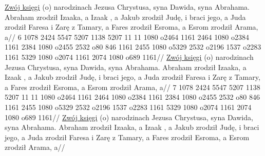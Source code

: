 \glb \underline{Zwój księgi} (o) narodzinach Jezusa Chrystusa, syna Dawida, syna Abrahama.  Abraham zrodził Izaaka, a Izaak , a Jakub zrodził Judę, i braci jego,  a Juda zrodził Faresa i Zarę z Tamary, a Fares zrodził Esroma, a Esrom zrodził Arama,  a//
\endgl
\begingl\lettrine[loversize=1,lraise=-1.3]{6 }{}%
 {} 1078 2424 5547 5207 1138 5207 11 {} 11 1080 o2464 1161 2464 1080 o2384 1161 2384 1080 o2455 2532 o80 846 {} 1161 2455 1080 o5329 2532 o2196 1537 o2283 1161 5329 1080 o2074 1161 2074 1080 o689 {} 1161//
\glb \underline{Zwój księgi} (o) narodzinach Jezusa Chrystusa, syna Dawida, syna Abrahama.  Abraham zrodził Izaaka, a Izaak , a Jakub zrodził Judę, i braci jego,  a Juda zrodził Faresa i Zarę z Tamary, a Fares zrodził Esroma, a Esrom zrodził Arama,  a//
\endgl
\begingl\lettrine[loversize=1,lraise=-1.3]{7 }{}%
 {} 1078 2424 5547 5207 1138 5207 11 {} 11 1080 o2464 1161 2464 1080 o2384 1161 2384 1080 o2455 2532 o80 846 {} 1161 2455 1080 o5329 2532 o2196 1537 o2283 1161 5329 1080 o2074 1161 2074 1080 o689 {} 1161//
\glb \underline{Zwój księgi} (o) narodzinach Jezusa Chrystusa, syna Dawida, syna Abrahama.  Abraham zrodził Izaaka, a Izaak , a Jakub zrodził Judę, i braci jego,  a Juda zrodził Faresa i Zarę z Tamary, a Fares zrodził Esroma, a Esrom zrodził Arama,  a//
\endgl